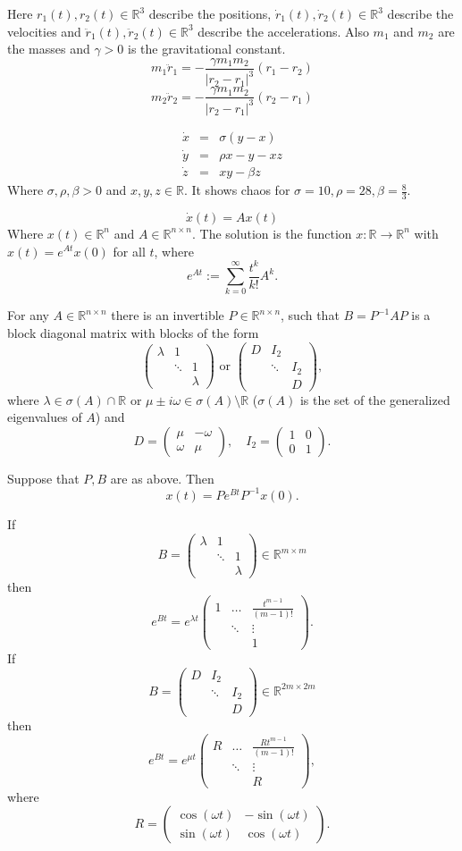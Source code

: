 \documentclass{article}
\newcommand*{\R}{\mathbb{R}}
\newcommand*{\mattwo}[4]{\begin{pmatrix}
    #1&#2\\#3&#4
\end{pmatrix}}
\newcommand*{\matthree}[9]{\begin{pmatrix}
    #1&#2&#3\\#4&#5&#6\\#7&#8&#9
\end{pmatrix}}
\newcommand*{\matuthree}[6]{\begin{pmatrix}
    #1&#2&#3\\ &#4&#5\\ &&#6
\end{pmatrix}}
\newcommand{\matdoublediagthree}[5]{\matthree{#1}{#2}{\,}{\,}{#3}{#4}{\,}{\,}{#5}}
\begin{document}
\begin{exam}
    Here $r_1(t),r_2(t) \in \R^3$ describe the positions, $\dot r_1(t), \dot r_2(t) \in \R^3$ describe the velocities and $\ddot r_1(t),\ddot r_2(t) \in \R^3$ describe the accelerations. Also $m_1$ and $m_2$ are the masses and $\gamma > 0$ is the gravitational constant.
    $$m_1\ddot r_1 = - \frac{\gamma m_1 m_2}{|r_2-r_1|^3}(r_1-r_2)$$
    $$m_2\ddot r_2 = - \frac{\gamma m_1 m_2}{|r_2-r_1|^3}(r_2-r_1)$$
\end{exam}

\begin{exam}
    $$\begin{array}{rcl}\dot x &=& \sigma(y-x)\\
    \dot y &=& \rho x-y-xz\\
    \dot z &=& xy-\beta z
    \end{array}$$
    Where $\sigma,\rho, \beta > 0$ and $x,y,z \in \R$. It shows chaos for $\sigma = 10, \rho = 28, \beta=\frac83$.
\end{exam}

\begin{exam}
    $$\dot x(t) = Ax(t)$$
    Where $x(t)\in \R^n$ and $A \in \R^{n \times n}$. The solution is the function $x: \R \to \R^{n}$ with $x(t)=e^{At}x(0)$ for all $t$, where
    $$e^{At}:=\sum_{k=0}^\infty\frac{t^k}{k!}A^k.$$
\end{exam}

\begin{thm}
    For any $A \in \R^{n\times n} $ there is an invertible $P \in \R^{n \times n}$, such that $B = P^{-1}AP$ is a block diagonal matrix with blocks of the form\\
    $$\matdoublediagthree\lambda1\ddots1\lambda \text{ or } \matdoublediagthree{D}{I_2}{\ddots}{I_2}{D},$$
    where $\lambda \in \sigma(A)\cap \R$ or $\mu \pm i\omega \in \sigma(A)\setminus\R$ ($\sigma(A)$ is the set of the generalized eigenvalues of $A$) and
    $$D = \mattwo\mu{-\omega}\omega\mu, \quad I_2=\mattwo1001.$$
\end{thm}

\begin{cor}
    Suppose that $P,B$ are as above. Then
    $$x(t)=Pe^{Bt}P^{-1}x(0).$$
\end{cor}

\begin{prop}
    If
    $$B = \matdoublediagthree{\lambda}{1}{\ddots}{1}{\lambda} \in \mathbb{R}^{m \times m}$$
    then
    $$e^{Bt} = e^{\lambda t}\matuthree1\dots{\frac{t^{m-1}}{(m-1)!}}\ddots\vdots1.$$
    If
    $$B = \matdoublediagthree{D}{I_2}{\ddots}{I_2}{D}  \in \mathbb{R}^{2m \times 2m}$$
    then
    $$e^{Bt}=e^{\mu t}\matuthree R\dots{\frac{Rt^{m-1}}{(m-1)!}}\ddots\vdots R,$$
    where
    $$R = \mattwo{\cos(\omega t)}{-\sin(\omega t)}{\sin(\omega t)}{\cos(\omega t)}.$$
\end{prop}
\end{document}
